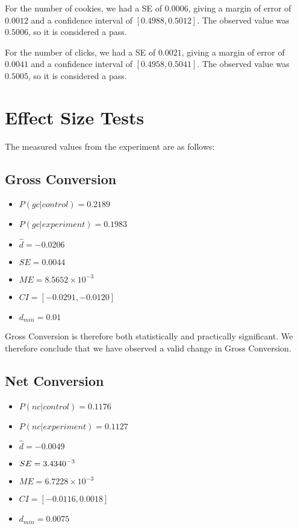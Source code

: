 \documentclass[12pt,a4paper]{article}
\begin{document}
For the number of cookies, we had a SE of $0.0006$, giving a margin of error of
$0.0012$ and a confidence interval of $[ 0.4988, 0.5012 ]$. The observed value
was $0.5006$, so it is considered a pass.

For the number of clicks, we had a SE of $0.0021$, giving a margin of error of
$0.0041$ and a confidence interval of $[ 0.4958, 0.5041 ]$. The observed value
was $0.5005$, so it is considered a pass.

\section{Effect Size Tests}
The measured values from the experiment are as follows:

\subsection{Gross Conversion}
\begin{itemize}
\item $P(gc|control) = 0.2189$
\item $P(gc|experiment) = 0.1983$
\item $\hat{d} = -0.0206$
\item $SE = 0.0044$
\item $ME = 8.5652 \times 10^{-3}$
\item $CI = [-0.0291,-0.0120]$
\item $d_{min} = 0.01$
\end{itemize}

Gross Conversion is therefore both statistically and practically significant. We
therefore conclude that we have observed a valid change in Gross Conversion.

\subsection{Net Conversion}
\begin{itemize}
\item $P(nc|control) = 0.1176$
\item $P(nc|experiment) = 0.1127$
\item $\hat{d} = -0.0049$
\item $SE = 3.4340 \time 10^{-3}$
\item $ME = 6.7228 \times 10^{-3}$
\item $CI = [-0.0116,0.0018]$
\item $d_{min} = 0.0075$
\end{itemize}
\end{document}
